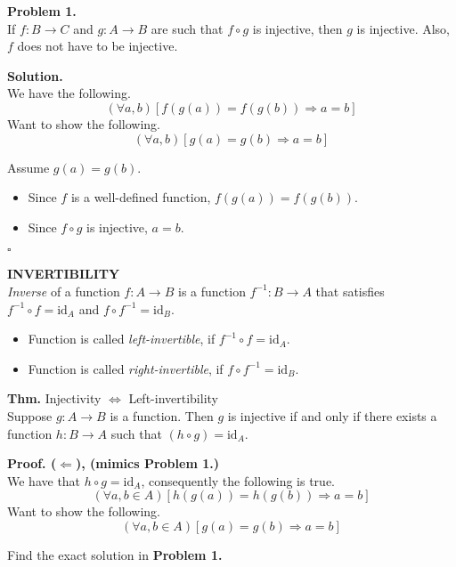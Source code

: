 \documentclass{article}
\newenvironment{problem}[2][Problem]
    { \begin{mdframed}[backgroundcolor=gray!20] \textbf{#1 #2}\\}
    {  \end{mdframed}}
\newenvironment{impdef}[1]
    { \begin{mdframed}[backgroundcolor=green!10] \textbf{#1} \vspace{0.15cm}\\}
    {  \end{mdframed}}
\newenvironment{theorem}[2][Thm.]
    { \begin{mdframed}[backgroundcolor=blue!10] \textbf{#1} {#2} \vspace{0.2cm}\\}
    {  \end{mdframed}}
\newenvironment{solution}[2][Solution.]
    { \begin{mdframed}[] \textbf{#1 #2} \\}
    {  \end{mdframed}}
\newenvironment{prf}[2][Proof.]
    { \begin{mdframed}[] \textbf{#1 #2} \\}
    {  \end{mdframed}}
\newcommand{\ec}{\hfill $\square$\nn}
\begin{document}
    \begin{problem}{1.}
        If $f: B \to C$ and $g: A\to B$ are such that $f \circ g$ is injective, then $g$ is injective. Also, $f$ does not have to be injective.
    \end{problem}
    
    \begin{solution}{}
        We have the following.
        \[(\forall a, b)[f(g(a)) = f(g(b)) \Rightarrow a = b]\]
        Want to show the following.
        \[(\forall a, b)[g(a) = g(b) \Rightarrow a = b]\]
        
        Assume $g(a) = g(b)$.
        \begin{itemize}
            \item Since $f$ is a well-defined function, $f(g(a)) = f(g(b))$.
            \item Since $f \circ g$ is injective, $a = b$.
        \end{itemize} \ec
    \end{solution}
    
    \clearpage
    
    \begin{impdef}{INVERTIBILITY}
        \textit{Inverse} of a function $f:A\to B$ is a function $f^{-1}:B\to A$ that satisfies $f^{-1} \circ f = \text{id}_A$ and $f \circ f^{-1} = \text{id}_B$.
        
        \begin{itemize}
            \item Function is called \textit{left-invertible}, if $f^{-1} \circ f = \text{id}_A$.
            \item Function is called \textit{right-invertible}, if $f\circ f^{-1} = \text{id}_B$.
        \end{itemize}
    \end{impdef}
    
    \begin{theorem}{Injectivity $\Leftrightarrow$ Left-invertibility}
        Suppose $g: A\to B$ is a function. Then $g$ is injective if and only if there exists a function $h: B\to A$ such that $(h\circ g) = \text{id}_A$.
    \end{theorem}
    
    \begin{prf}{($\Longleftarrow$), (mimics Problem 1.)}
        We have that $h \circ g = \text{id}_A$, consequently the following is true.
        \[(\forall a,b \in A)[h(g(a)) = h(g(b)) \Rightarrow a = b]\]
        Want to show the following.
        \[(\forall a,b \in A)[g(a) = g(b) \Rightarrow a = b]\]
        
        Find the exact solution in \textbf{Problem 1.}
    \end{prf}
    
\end{document}
